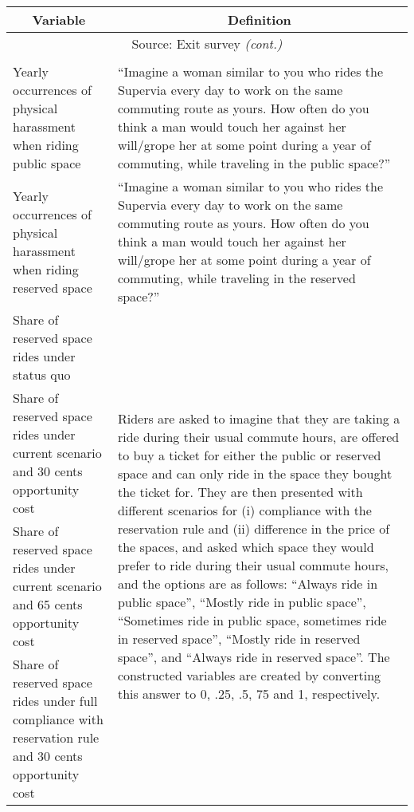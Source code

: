 \begin{table}[H]
    \centering
    \singlespacing
    \footnotesize
    \begin{tabular}{p{.4\linewidth}p{.6\linewidth}}
    \hline\hline 
          \multicolumn{1}{c}{\textbf{Variable}}	&	\multicolumn{1}{c}{\textbf{Definition}}	\\ 
   \hline 
    \multicolumn{2}{c}{Source: Exit survey \textit{(cont.)}} \\
\hline\\[-1.8ex]
Yearly occurrences of physical harassment when riding public space	    & ``Imagine a woman similar to you who rides the Supervia every day to work on the same commuting route as yours. How often do you think a man would touch her against her will/grope her at some point during a year of commuting, while traveling in the public space?''		\\
Yearly occurrences of physical harassment when riding reserved space	& ``Imagine a woman similar to you who rides the Supervia every day to work on the same commuting route as yours. How often do you think a man would touch her against her will/grope her at some point during a year of commuting, while traveling in the reserved space?''		\\
Share of reserved space rides under status quo	& \multirow{5}{*}{\parbox{\linewidth}{Riders are asked to imagine that they are taking a ride during their usual commute hours, are offered to buy a ticket for either the public or reserved space and can only ride in the space they bought the ticket for.
They are then presented with different scenarios for (i) compliance with the reservation rule and (ii) difference in the price of the spaces, and asked which space they would prefer to ride during their usual commute hours, and the options are as follows: ``Always ride in public space'', ``Mostly ride in public space'', ``Sometimes ride in public space, sometimes ride in reserved space'', ``Mostly ride in reserved space'', and ``Always ride in reserved space''. The constructed variables are created by converting this answer to 0, .25, .5, 75 and 1, respectively.}}  \\
Share of reserved space rides under current scenario and 30 cents opportunity cost	&		\\
Share of reserved space rides under current scenario and 65 cents opportunity cost	&		\\
Share of reserved space rides under full compliance with reservation rule and 30 cents opportunity cost	&		\\

\end{tabular}
\end{table}
